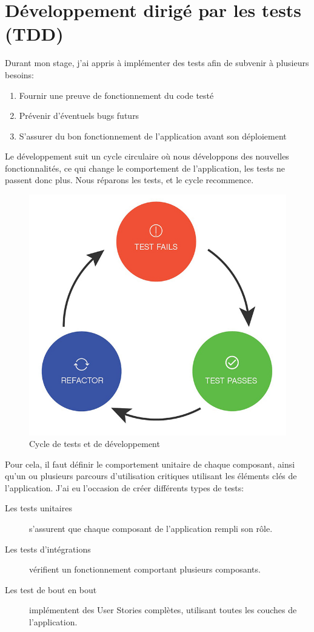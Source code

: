 \documentclass[12pt, a4paper]{report}
\begin{document}
\section{Développement dirigé par les tests (TDD)}
Durant mon stage, j'ai appris à implémenter des tests afin de subvenir à plusieurs besoins\@:
\begin{enumerate}
    \item Fournir une preuve de fonctionnement du code testé
    \item Prévenir d'éventuels bugs futurs
    \item S'assurer du bon fonctionnement de l'application avant son déploiement
\end{enumerate}
Le développement suit un cycle circulaire où nous développons des nouvelles fonctionnalités, ce qui change le comportement de l'application, les tests ne passent donc plus. Nous réparons les tests, et le cycle recommence.
\begin{figure}[H]
    \begin{center}
        \includegraphics[width=0.5\linewidth]{TDD.jpg}
    \end{center}
    \caption{Cycle de tests et de développement}
\end{figure}
Pour cela, il faut définir le comportement unitaire de chaque composant, ainsi qu'un ou plusieurs parcours d'utilisation critiques utilisant les éléments clés de l'application.\newline
J'ai eu l'occasion de créer différents types de tests\@:
\begin{description}
    \item [Les tests unitaires] s'assurent que chaque composant de l'application rempli son rôle.
    \item [Les tests d'intégrations] vérifient un fonctionnement comportant plusieurs composants.
    \item [Les test de bout en bout] implémentent des User Stories complètes, utilisant toutes les couches de l'application.
\end{description}
\end{document}
